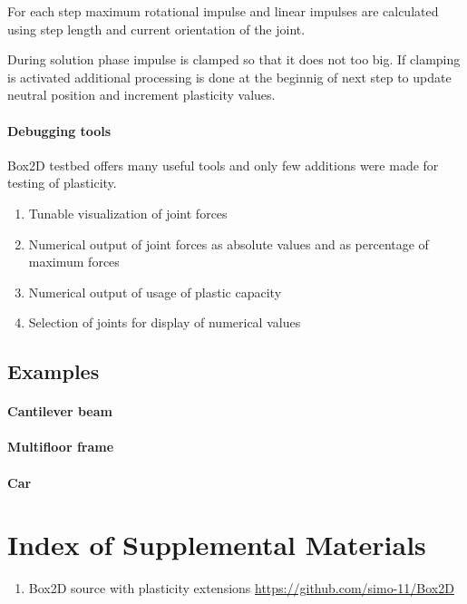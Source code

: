 \documentclass{jcgt}
\begin{document}
For each step maximum rotational impulse and linear impulses are calculated using step length and 
current orientation of the joint.

During solution phase impulse is clamped so that it does not too big.
If clamping is activated additional processing is done at the beginnig of next step to update neutral position and
increment plasticity values.

\paragraph{Debugging tools} 
Box2D testbed offers many useful tools and only few additions were made for testing of plasticity.
\begin{enumerate}
\item Tunable visualization of joint forces
\item Numerical output of joint forces as absolute values and as percentage of maximum forces
\item Numerical output of usage of plastic capacity
\item Selection of joints for display of numerical values
\end{enumerate}

\subsection{Examples} 

\paragraph{Cantilever beam} 

\paragraph{Multifloor frame} 

\paragraph{Car} 



\small



\section*{Index of Supplemental Materials}

\begin{enumerate}
\item Box2D source with plasticity extensions 
 \href{https://github.com/simo-11/Box2D}{https://github.com/simo-11/Box2D}

\end{enumerate}
\end{document}
